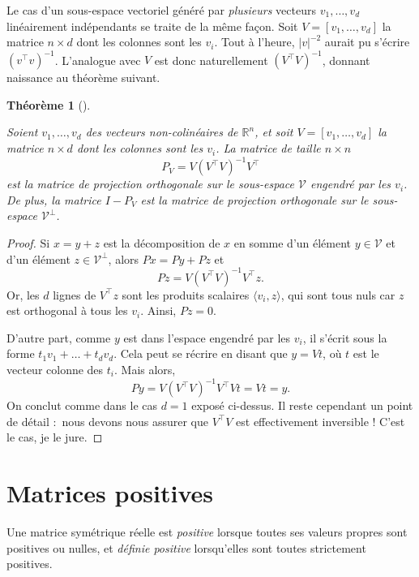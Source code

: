 \documentclass[
  10,
  letterpaper,
  DIV=11,
  numbers=noendperiod]{scrreport}
\theoremstyle{plain}
\newtheorem{theorem}{Théorème}[chapter]
\theoremstyle{definition}
\theoremstyle{plain}
\theoremstyle{definition}
\theoremstyle{definition}
\theoremstyle{plain}
\theoremstyle{remark}
\begin{document}
Le cas d'un sous-espace vectoriel généré par \emph{plusieurs} vecteurs
\(v_1, \dotsc, v_d\) linéairement indépendants se traite de la même
façon. Soit \(V = [v_1, \dotsc, v_d]\) la matrice \(n \times d\) dont
les colonnes sont les \(v_i\). Tout à l'heure, \(|v|^{-2}\) aurait pu
s'écrire \((v^\top v)^{-1}\). L'analogue avec \(V\) est donc
naturellement \((V^\top V)^{-1}\), donnant naissance au théorème
suivant.

\begin{theorem}[]\protect\hypertarget{thm-projortho}{}\label{thm-projortho}

Soient \(v_1, \dotsc, v_d\) des vecteurs non-colinéaires de
\(\mathbb{R}^n\), et soit \(V = [v_1, \dotsc, v_d]\) la matrice
\(n \times d\) dont les colonnes sont les \(v_i\). La matrice de taille
\(n\times n\) \[P_V = V (V^\top V)^{-1}V^\top \] est la matrice de
projection orthogonale sur le sous-espace \(\mathscr{V}\) engendré par
les \(v_i\). De plus, la matrice \(I - P_V\) est la matrice de
projection orthogonale sur le sous-espace \(\mathscr{V}^\perp\).

\end{theorem}

\begin{proof}

Si \(x=y+z\) est la décomposition de \(x\) en somme d'un élément
\(y\in\mathscr{V}\) et d'un élément \(z \in \mathscr{V}^\perp\), alors
\(Px = Py + Pz\) et \[ Pz = V(V^\top V)^{-1}V^\top z.\] Or, les \(d\)
lignes de \(V^\top z\) sont les produits scalaires
\(\langle v_i, z\rangle\), qui sont tous nuls car \(z\) est orthogonal à
tous les \(v_i\). Ainsi, \(Pz = 0\).

D'autre part, comme \(y\) est dans l'espace engendré par les \(v_i\), il
s'écrit sous la forme \(t_1 v_1 + \dotsc + t_d v_d\). Cela peut se
récrire en disant que \(y = V t\), où \(t\) est le vecteur colonne des
\(t_i\). Mais alors, \[ Py = V(V^\top V)^{-1}V^\top V t = Vt = y.\] On
conclut comme dans le cas \(d=1\) exposé ci-dessus. Il reste cependant
un point de détail :~nous devons nous assurer que \(V^\top V\) est
effectivement inversible ! C'est le cas, je le jure.

\end{proof}

\hypertarget{sec-defpos}{%
\section{Matrices positives}\label{sec-defpos}}

Une matrice symétrique réelle est \emph{positive} lorsque toutes ses
valeurs propres sont positives ou nulles, et \emph{définie positive}
lorsqu'elles sont toutes strictement positives.
\end{document}
